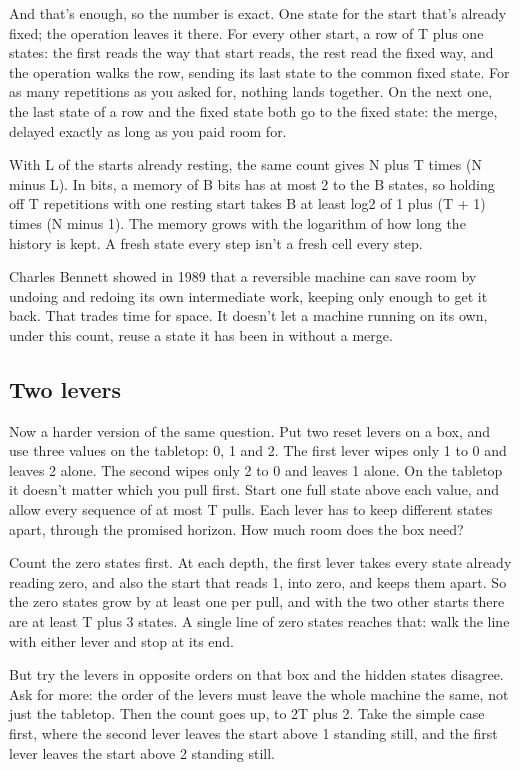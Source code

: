 \documentclass[11pt,twoside]{article}
\theoremstyle{thielethm}
\theoremstyle{thieledef}
\theoremstyle{thieledef}
\theoremstyle{thieledef}
\theoremstyle{thielethm}
\theoremstyle{thieleobs}
\theoremstyle{thielethm}
\begin{document}
And that's enough, so the number is exact. One state for the start that's already fixed; the operation leaves it there. For every other start, a row of T plus one states: the first reads the way that start reads, the rest read the fixed way, and the operation walks the row, sending its last state to the common fixed state. For as many repetitions as you asked for, nothing lands together. On the next one, the last state of a row and the fixed state both go to the fixed state: the merge, delayed exactly as long as you paid room for.

With L of the starts already resting, the same count gives N plus T times (N minus L). In bits, a memory of B bits has at most 2 to the B states, so holding off T repetitions with one resting start takes B at least log2 of 1 plus (T + 1) times (N minus 1). The memory grows with the logarithm of how long the history is kept. A fresh state every step isn't a fresh cell every step.

Charles Bennett showed in 1989 that a reversible machine can save room by undoing and redoing its own intermediate work, keeping only enough to get it back. That trades time for space. It doesn't let a machine running on its own, under this count, reuse a state it has been in without a merge.

\subsection{Two levers}

Now a harder version of the same question. Put two reset levers on a box, and use three values on the tabletop: 0, 1 and 2. The first lever wipes only 1 to 0 and leaves 2 alone. The second wipes only 2 to 0 and leaves 1 alone. On the tabletop it doesn't matter which you pull first. Start one full state above each value, and allow every sequence of at most T pulls. Each lever has to keep different states apart, through the promised horizon. How much room does the box need?

Count the zero states first. At each depth, the first lever takes every state already reading zero, and also the start that reads 1, into zero, and keeps them apart. So the zero states grow by at least one per pull, and with the two other starts there are at least T plus 3 states. A single line of zero states reaches that: walk the line with either lever and stop at its end.

But try the levers in opposite orders on that box and the hidden states disagree. Ask for more: the order of the levers must leave the whole machine the same, not just the tabletop. Then the count goes up, to 2T plus 2. Take the simple case first, where the second lever leaves the start above 1 standing still, and the first lever leaves the start above 2 standing still.
\end{document}
